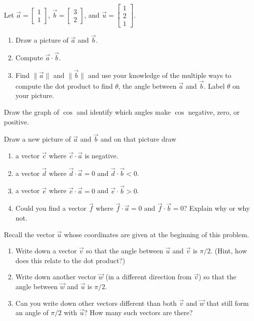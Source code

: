 \documentclass{problemset}
\begin{document}
	\question
		Let $\vec a=\begin{bmatrix}1\\1\end{bmatrix}$, $\vec b=\begin{bmatrix}3\\2\end{bmatrix}$, and $\vec u=\begin{bmatrix}1\\2\\1\end{bmatrix}$.
	\begin{parts}
		\item 
		\begin{enumerate}	
			\item Draw a picture of $\vec a $ and $\vec b$.
			\item Compute $\vec a\cdot \vec b$.
			\item Find $\|\vec a\|$ and $\|\vec b\|$ and use your knowledge of
			the multiple ways to compute the dot product to find $\theta$,
			the angle between $\vec a$ and $\vec b$. Label $\theta$ on your picture.
		\end{enumerate}
		\item Draw the graph of $\cos$ and identify which angles make $\cos$ negative, zero,
		or positive.

		\item Draw a new picture of $\vec a$ and $\vec b$ and on that picture draw
		\begin{enumerate}	
			\item a vector $\vec c$ where $\vec c\cdot \vec a$ is negative.
			\item a vector $\vec d$ where $\vec d\cdot \vec a=0$ and $\vec d\cdot \vec b < 0$.
			\item a vector $\vec e$ where $\vec e\cdot \vec a=0$ and $\vec e\cdot \vec b>0$.
			\item Could you find a vector $\vec f$ where $\vec f\cdot \vec a=0$ and $\vec f\cdot \vec b=0$?
			Explain why or why not.
		\end{enumerate}

		\item Recall the vector $\vec u$ whose coordinates are given at the beginning of this problem.
		\begin{enumerate}
			\item Write down a vector $\vec v$ so that the angle between $\vec u$ and $\vec v$
			is $\pi/2$. (Hint, how does this relate to the dot product?)
			\item Write down another vector $\vec w$ (in a different direction from $\vec v$)
			so that the angle between $\vec w$ and $\vec u$ is $\pi/2$.
			\item Can you write down other vectors different than both $\vec v$ and $\vec w$ that still
			form an angle of $\pi/2$ with $\vec u$?  How many such vectors are there?
		\end{enumerate}
	\end{parts}
\end{document}
